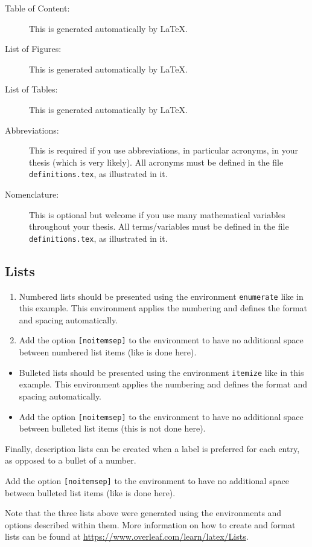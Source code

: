 \documentclass[11pt,twoside,openright]{report}
\begin{document}
\begin{description}
    \item [Table of Content:] This is generated automatically by \LaTeX{}.
    
    \item [List of Figures:] This is generated automatically by \LaTeX{}.
    
    \item [List of Tables:] This is generated automatically by \LaTeX{}.
    
    \item [Abbreviations:] This is required if you use abbreviations, in particular acronyms, in your thesis (which is very likely). All acronyms must be defined in the file \verb|definitions.tex|, as illustrated in it.
    
    \item [Nomenclature:] This is optional but welcome if you use many mathematical variables throughout your thesis. All terms/variables must be defined in the file \verb|definitions.tex|, as illustrated in it. 
\end{description}


\subsection{Lists}
\label{subsec:lists}

\begin{enumerate}[noitemsep]
  \item Numbered lists should be presented using the environment \verb|enumerate| like in this example. 
  This environment applies the numbering and defines the format and spacing automatically. 
  \item Add the option \verb|[noitemsep]| to the environment to have no additional space between numbered list items (like is done here).
\end{enumerate}

\begin{itemize}
  \item Bulleted lists should be presented using the environment \verb|itemize| like in this example. 
  This environment applies the numbering and defines the format and spacing automatically. 
  \item Add the option \verb|[noitemsep]| to the environment to have no additional space between bulleted list items  (this is not done here).
\end{itemize}

\begin{description}[noitemsep]
  \item[Label 1] Finally, description lists can be created when a label is preferred for each entry, as opposed to a bullet of a number.
  \item[Label 2] Add the option \verb|[noitemsep]| to the environment to have no additional space between bulleted list items (like is done here).
\end{description}
%
Note that the three lists above were generated using the environments and options described within them.
More information on how to create and format lists can be found at \url{https://www.overleaf.com/learn/latex/Lists}.
\end{document}
